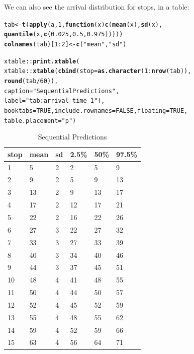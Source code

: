 \documentclass[11pt]{article}\usepackage[]{graphicx}\usepackage[]{color}
\makeatletter
\newcommand{\hlnum}[1]{\textcolor[rgb]{0.686,0.059,0.569}{#1}}%
\newcommand{\hlstr}[1]{\textcolor[rgb]{0.192,0.494,0.8}{#1}}%
\newcommand{\hlopt}[1]{\textcolor[rgb]{0,0,0}{#1}}%
\newcommand{\hlstd}[1]{\textcolor[rgb]{0.345,0.345,0.345}{#1}}%
\newcommand{\hlkwa}[1]{\textcolor[rgb]{0.161,0.373,0.58}{\textbf{#1}}}%
\newcommand{\hlkwb}[1]{\textcolor[rgb]{0.69,0.353,0.396}{#1}}%
\newcommand{\hlkwc}[1]{\textcolor[rgb]{0.333,0.667,0.333}{#1}}%
\newcommand{\hlkwd}[1]{\textcolor[rgb]{0.737,0.353,0.396}{\textbf{#1}}}%
\newenvironment{kframe}{%
 \def\at@end@of@kframe{}%
 \ifinner\ifhmode%
  \def\at@end@of@kframe{\end{minipage}}%
  \begin{minipage}{\columnwidth}%
 \fi\fi%
 \def\FrameCommand##1{\hskip\@totalleftmargin \hskip-\fboxsep
 \colorbox{shadecolor}{##1}\hskip-\fboxsep
     \hskip-\linewidth \hskip-\@totalleftmargin \hskip\columnwidth}%
 \MakeFramed {\advance\hsize-\width
   \@totalleftmargin\z@ \linewidth\hsize
   \@setminipage}}%
 {\par\unskip\endMakeFramed%
 \at@end@of@kframe}
\makeatother
\begin{document}
We can also see the arrival distribution for stops, in a table:
\begin{kframe}
\begin{alltt}
\hlstd{tab} \hlkwb{<-} \hlkwd{t}\hlstd{(}\hlkwd{apply}\hlstd{(a,} \hlnum{1}\hlstd{,} \hlkwa{function}\hlstd{(}\hlkwc{x}\hlstd{)} \hlkwd{c}\hlstd{(}\hlkwd{mean}\hlstd{(x),} \hlkwd{sd}\hlstd{(x),}
                                   \hlkwd{quantile}\hlstd{(x,} \hlkwd{c}\hlstd{(}\hlnum{0.025}\hlstd{,} \hlnum{0.5}\hlstd{,} \hlnum{0.975}\hlstd{)))))}
\hlkwd{colnames}\hlstd{(tab)[}\hlnum{1}\hlopt{:}\hlnum{2}\hlstd{]} \hlkwb{<-} \hlkwd{c}\hlstd{(}\hlstr{"mean"}\hlstd{,} \hlstr{"sd"}\hlstd{)}

\hlstd{xtable}\hlopt{::}\hlkwd{print.xtable}\hlstd{(}
    \hlstd{xtable}\hlopt{::}\hlkwd{xtable}\hlstd{(}\hlkwd{cbind}\hlstd{(}\hlkwc{stop} \hlstd{=} \hlkwd{as.character}\hlstd{(}\hlnum{1}\hlopt{:}\hlkwd{nrow}\hlstd{(tab)),}
                         \hlkwd{round}\hlstd{(tab} \hlopt{/} \hlnum{60}\hlstd{)),}
                   \hlkwc{caption} \hlstd{=} \hlstr{"Sequential Predictions"}\hlstd{,}
                   \hlkwc{label} \hlstd{=} \hlstr{"tab:arrival_time_1"}\hlstd{),}
    \hlkwc{booktabs} \hlstd{=} \hlnum{TRUE}\hlstd{,} \hlkwc{include.rownames} \hlstd{=} \hlnum{FALSE}\hlstd{,} \hlkwc{floating} \hlstd{=} \hlnum{TRUE}\hlstd{,}
    \hlkwc{table.placement} \hlstd{=} \hlstr{"p"}\hlstd{)}
\end{alltt}
\end{kframe}%
\begin{table}[p]
\centering
\begin{tabular}{llllll}
  \toprule
stop & mean & sd & 2.5\% & 50\% & 97.5\% \\ 
  \midrule
1 & 5 & 2 & 2 & 5 & 9 \\ 
  2 & 9 & 2 & 5 & 9 & 13 \\ 
  3 & 13 & 2 & 9 & 13 & 17 \\ 
  4 & 17 & 2 & 12 & 17 & 21 \\ 
  5 & 22 & 2 & 16 & 22 & 26 \\ 
  6 & 27 & 3 & 22 & 27 & 32 \\ 
  7 & 33 & 3 & 27 & 33 & 39 \\ 
  8 & 40 & 3 & 34 & 40 & 46 \\ 
  9 & 44 & 3 & 37 & 45 & 51 \\ 
  10 & 48 & 4 & 41 & 48 & 55 \\ 
  11 & 50 & 4 & 44 & 50 & 57 \\ 
  12 & 52 & 4 & 45 & 52 & 59 \\ 
  13 & 55 & 4 & 48 & 55 & 62 \\ 
  14 & 59 & 4 & 52 & 59 & 66 \\ 
  15 & 63 & 4 & 56 & 64 & 71 \\ 
   \bottomrule
\end{tabular}
\caption{Sequential Predictions} 
\label{tab:arrival_time_1}
\end{table}
\end{document}
